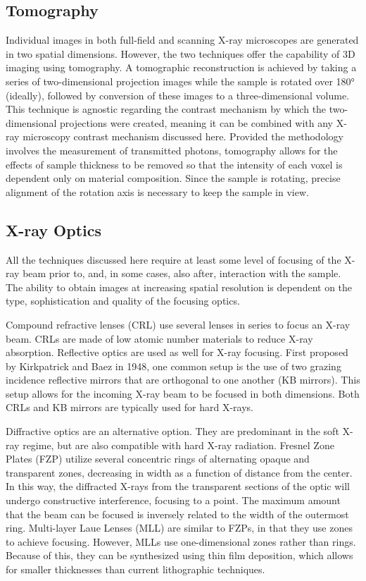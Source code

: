 \documentclass[journal=cmatex,manuscript=perspective]{achemso}
\begin{document}
\subsection{Tomography}

Individual images in both full-field and scanning X-ray microscopes
are generated in two spatial dimensions. However, the two techniques
offer the capability of 3D imaging using tomography. A tomographic
reconstruction is achieved by taking a series of two-dimensional
projection images while the sample is rotated over \ang{180}
(ideally), followed by conversion of these images to a
three-dimensional volume. This technique is agnostic regarding the
contrast mechanism by which the two-dimensional projections were
created, meaning it can be combined with any X-ray microscopy contrast
mechanism discussed here. Provided the methodology involves the
measurement of transmitted photons, tomography allows for the effects
of sample thickness to be removed so that the intensity of each voxel
is dependent only on material composition. Since the sample is
rotating, precise alignment of the rotation axis is necessary to keep
the sample in view.

\subsection{X-ray Optics}

All the techniques discussed here require at least some level of
focusing of the X-ray beam prior to, and, in some cases, also after,
interaction with the sample. The ability to obtain images at
increasing spatial resolution is dependent on the type, sophistication
and quality of the focusing optics.

Compound refractive lenses (CRL) use several lenses in series to focus
an X-ray beam. CRLs are made of low atomic number materials to reduce
X-ray absorption\cite{lengeler1996}. Reflective optics are used as
well for X-ray focusing. First proposed by Kirkpatrick and Baez in
1948, one common setup is the use of two grazing incidence reflective
mirrors that are orthogonal to one another (KB mirrors). This setup
allows for the incoming X-ray beam to be focused in both
dimensions. Both CRLs and KB mirrors are typically used for hard
X-rays\cite{kirkpatrick1948}.

Diffractive optics are an alternative option. They are predominant in
the soft X-ray regime, but are also compatible with hard X-ray
radiation. Fresnel Zone Plates (FZP) utilize several concentric rings
of alternating opaque and transparent zones, decreasing in width as a
function of distance from the center. In this way, the diffracted
X-rays from the transparent sections of the optic will undergo
constructive interference, focusing to a point. The maximum amount
that the beam can be focused is inversely related to the width of the
outermost ring.  Multi-layer Laue Lenses (MLL) are similar to FZPs, in
that they use zones to achieve focusing. However, MLLs use
one-dimensional zones rather than rings. Because of this, they can be
synthesized using thin film deposition, which allows for smaller
thicknesses than current lithographic
techniques\cite{synchrotronradiation,lblzoneplate}.
\end{document}
